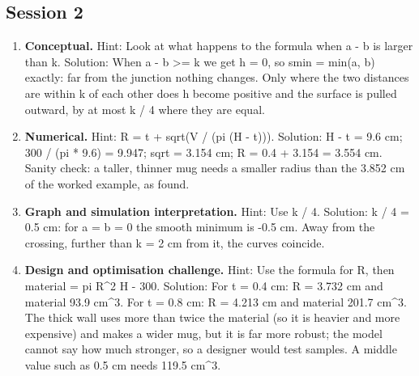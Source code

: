 \documentclass[11pt,a4paper]{article}
\begin{document}
\subsection*{Session 2}
\begin{enumerate}[nosep]
\item \textbf{Conceptual.} Hint: Look at what happens to the formula when \textbar{}a - b\textbar{} is larger than k. Solution: When \textbar{}a - b\textbar{} \textgreater{}= k we get h = 0, so smin = min(a, b) exactly: far from the junction nothing changes. Only where the two distances are within k of each other does h become positive and the surface is pulled outward, by at most k / 4 where they are equal.
\item \textbf{Numerical.} Hint: R = t + sqrt(V / (pi (H - t))). Solution: H - t = 9.6 cm; 300 / (pi * 9.6) = 9.947; sqrt = 3.154 cm; R = 0.4 + 3.154 = 3.554 cm. Sanity check: a taller, thinner mug needs a smaller radius than the 3.852 cm of the worked example, as found.
\item \textbf{Graph and simulation interpretation.} Hint: Use k / 4. Solution: k / 4 = 0.5 cm: for a = b = 0 the smooth minimum is -0.5 cm. Away from the crossing, further than k = 2 cm from it, the curves coincide.
\item \textbf{Design and optimisation challenge.} Hint: Use the formula for R, then material = pi R\textasciicircum{}2 H - 300. Solution: For t = 0.4 cm: R = 3.732 cm and material 93.9 cm\textasciicircum{}3. For t = 0.8 cm: R = 4.213 cm and material 201.7 cm\textasciicircum{}3. The thick wall uses more than twice the material (so it is heavier and more expensive) and makes a wider mug, but it is far more robust; the model cannot say how much stronger, so a designer would test samples. A middle value such as 0.5 cm needs 119.5 cm\textasciicircum{}3.
\end{enumerate}
\end{document}

